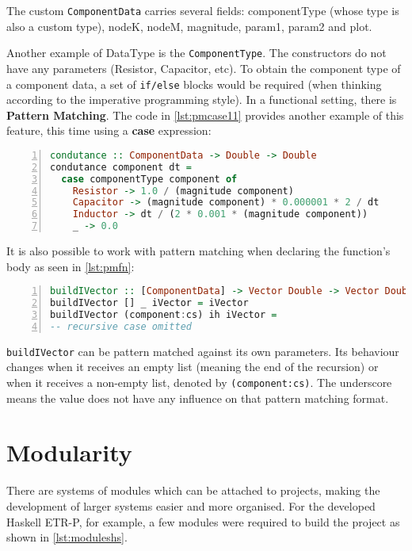 The custom \lstinline!ComponentData! carries several fields: componentType (whose type is also a custom type), nodeK, nodeM, magnitude, param1, param2 and plot.

Another example of DataType is the \lstinline!ComponentType!. The constructors do not have any parameters (Resistor, Capacitor, etc). To obtain the component type of a component data, a set of \lstinline!if/else! blocks would be required (when thinking according to the imperative programming style). In a functional setting, there is \textbf{Pattern Matching}. The code in \cref{lst:pmcase11} provides another example of this feature, this time using a \textbf{case} expression:

\begin{lstlisting}[language=Haskell, numbers=left, caption={Pattern matching example with case}, captionpos=b, label={lst:pmcase11}]
condutance :: ComponentData -> Double -> Double
condutance component dt =
  case componentType component of
    Resistor -> 1.0 / (magnitude component)
    Capacitor -> (magnitude component) * 0.000001 * 2 / dt
    Inductor -> dt / (2 * 0.001 * (magnitude component))
    _ -> 0.0
\end{lstlisting}

It is also possible to work with pattern matching when declaring the function's body as seen in \cref{lst:pmfn}:


\begin{lstlisting}[language=Haskell, numbers=left, caption={Pattern matching in functions}, captionpos=b, label={lst:pmfn}]
buildIVector :: [ComponentData] -> Vector Double -> Vector Double -> Vector Double
buildIVector [] _ iVector = iVector
buildIVector (component:cs) ih iVector =
-- recursive case omitted
\end{lstlisting}

\lstinline!buildIVector! can be pattern matched against its own parameters. Its behaviour changes when it receives an empty list (meaning the end of the recursion) or when it receives a non-empty list, denoted by \lstinline!(component:cs)!. The underscore means the value does not have any influence on that pattern matching format.


\section{Modularity}

There are systems of modules which can be attached to projects, making the development of larger systems easier and more organised. For the developed Haskell ETR-P, for example, a few modules were required to build the project as shown in \cref{lst:moduleshs}.


